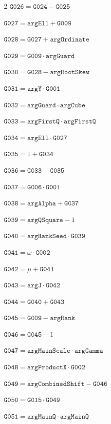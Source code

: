 \documentclass[10pt]{article}
\begin{document}
\begin{multicols}{2}
\noindent $\mathtt{G026}=\mathtt{G024}-\mathtt{G025}$\par
\noindent $\mathtt{G027}=\mathtt{argEll}+\mathtt{G009}$\par
\noindent $\mathtt{G028}=\mathtt{G027}+\mathtt{argOrdinate}$\par
\noindent $\mathtt{G029}=\mathtt{G009}\cdot \mathtt{argGuard}$\par
\noindent $\mathtt{G030}=\mathtt{G028}-\mathtt{argRootSkew}$\par
\noindent $\mathtt{G031}=\mathtt{argY}\cdot \mathtt{G001}$\par
\noindent $\mathtt{G032}=\mathtt{argGuard}\cdot \mathtt{argCube}$\par
\noindent $\mathtt{G033}=\mathtt{argFirstQ}\cdot \mathtt{argFirstQ}$\par
\noindent $\mathtt{G034}=\mathtt{argEll}\cdot \mathtt{G027}$\par
\noindent $\mathtt{G035}=1+\mathtt{G034}$\par
\noindent $\mathtt{G036}=\mathtt{G033}-\mathtt{G035}$\par
\noindent $\mathtt{G037}=\mathtt{G006}\cdot \mathtt{G001}$\par
\noindent $\mathtt{G038}=\mathtt{argAlpha}+\mathtt{G037}$\par
\noindent $\mathtt{G039}=\mathtt{argQSquare}-1$\par
\noindent $\mathtt{G040}=\mathtt{argRankSeed}\cdot \mathtt{G039}$\par
\noindent $\mathtt{G041}=\omega\cdot \mathtt{G002}$\par
\noindent $\mathtt{G042}=\mu+\mathtt{G041}$\par
\noindent $\mathtt{G043}=\mathtt{argJ}\cdot \mathtt{G042}$\par
\noindent $\mathtt{G044}=\mathtt{G040}+\mathtt{G043}$\par
\noindent $\mathtt{G045}=\mathtt{G009}-\mathtt{argRank}$\par
\noindent $\mathtt{G046}=\mathtt{G045}-1$\par
\noindent $\mathtt{G047}=\mathtt{argMainScale}\cdot \mathtt{argGamma}$\par
\noindent $\mathtt{G048}=\mathtt{argProductX}\cdot \mathtt{G002}$\par
\noindent $\mathtt{G049}=\mathtt{argCombinedShift}-\mathtt{G046}$\par
\noindent $\mathtt{G050}=\mathtt{G015}\cdot \mathtt{G049}$\par
\noindent $\mathtt{G051}=\mathtt{argMainQ}\cdot \mathtt{argMainQ}$\par

\end{multicols}
\end{document}
